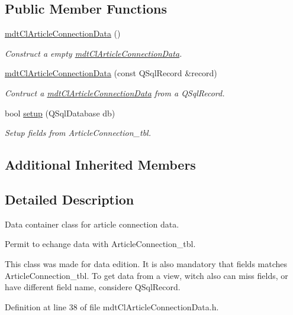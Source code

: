 \subsection*{Public Member Functions}
\begin{DoxyCompactItemize}
\item 
\hyperlink{classmdt_cl_article_connection_data_a617e468db5962199637a4e00534728ea}{mdt\-Cl\-Article\-Connection\-Data} ()
\begin{DoxyCompactList}\small\item\em Construct a empty \hyperlink{classmdt_cl_article_connection_data}{mdt\-Cl\-Article\-Connection\-Data}. \end{DoxyCompactList}\item 
\hyperlink{classmdt_cl_article_connection_data_a55b2069ec175c131375c25e2194d6d95}{mdt\-Cl\-Article\-Connection\-Data} (const Q\-Sql\-Record \&record)
\begin{DoxyCompactList}\small\item\em Contruct a \hyperlink{classmdt_cl_article_connection_data}{mdt\-Cl\-Article\-Connection\-Data} from a Q\-Sql\-Record. \end{DoxyCompactList}\item 
bool \hyperlink{classmdt_cl_article_connection_data_a224a769e87de03c2ced03b64a1c4a6ad}{setup} (Q\-Sql\-Database db)
\begin{DoxyCompactList}\small\item\em Setup fields from Article\-Connection\-\_\-tbl. \end{DoxyCompactList}\end{DoxyCompactItemize}
\subsection*{Additional Inherited Members}


\subsection{Detailed Description}
Data container class for article connection data. 

Permit to echange data with Article\-Connection\-\_\-tbl.

This class was made for data edition. It is also mandatory that fields matches Article\-Connection\-\_\-tbl. To get data from a view, witch also can miss fields, or have different field name, considere Q\-Sql\-Record. 

Definition at line 38 of file mdt\-Cl\-Article\-Connection\-Data.\-h.



